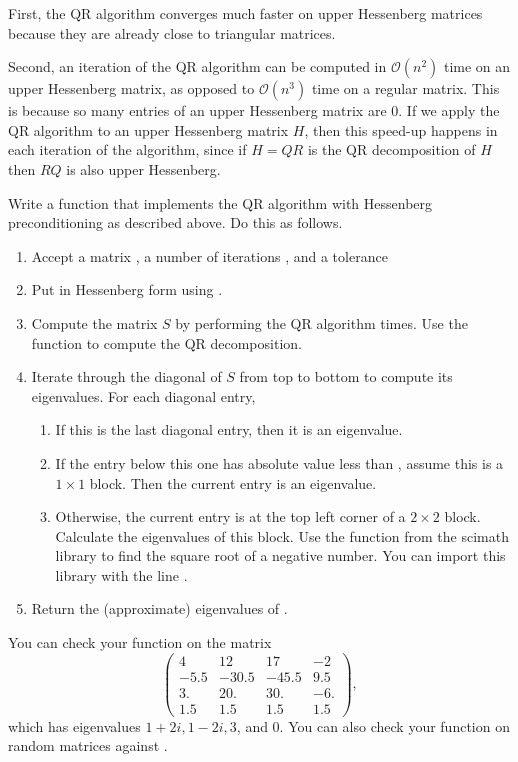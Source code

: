 First, the QR algorithm converges much faster on upper Hessenberg matrices because they are already close to triangular matrices. 

Second, an iteration of the QR algorithm can be computed in $\mathcal{O}(n^2)$ time on an upper Hessenberg matrix, as opposed to $\mathcal{O}(n^3)$ time on a regular matrix. 
This is because so many entries of an upper Hessenberg matrix are 0.
If we apply the QR algorithm to an upper Hessenberg matrix $H$, then this speed-up happens in each iteration of the algorithm, since if $H = QR$ is the QR decomposition of $H$ then $RQ$ is also upper Hessenberg.


\begin{problem}
Write a function that implements the QR algorithm with Hessenberg preconditioning as described above. 
Do this as follows.
\begin{enumerate}
\item Accept a matrix , a number of iterations , and a tolerance 
\item Put  in Hessenberg form using .
\item Compute the matrix $S$ by performing the QR algorithm  times. 
Use the function  to compute the QR decomposition.
\item Iterate through the diagonal of $S$ from top to bottom to compute its eigenvalues. 
For each diagonal entry,
\begin{enumerate}
\item If this is the last diagonal entry, then it is an eigenvalue.
\item If the entry below this one has absolute value less than , assume this is a $1\times 1$ block. 
Then the current entry is an eigenvalue.
\item Otherwise, the current entry is at the top left corner of a $2 \times 2$ block. 
Calculate the eigenvalues of this block. 
Use the  function from the scimath library to find the square root of a negative number. 
You can import this library with the line .
\end{enumerate}
\item Return the (approximate) eigenvalues of .
\end{enumerate}
You can check your function on the matrix
\[
\begin{pmatrix}
 4 &  12 & 17 &  -2 \\
-5.5& -30.5 & -45.5 &  9.5\\
 3. &  20. & 30. &  -6. \\
1.5 &  1.5&   1.5&   1.5
       \end{pmatrix},
\]
which has eigenvalues $1+2i, 1-2i, 3$, and 0. You can also check your function on random matrices against .
\label{prob:qr_solver}
\end{problem}


